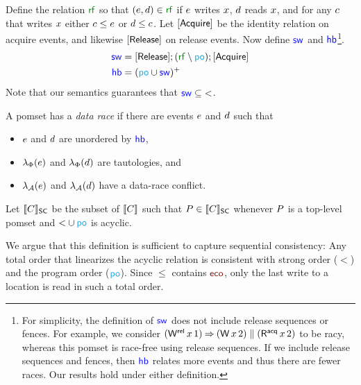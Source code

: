 Define the relation ${\rrfx}$ so that $(\aEv,\bEv)\in{\rrfx}$ if $e$
writes $x$, $d$ reads $x$, and for any $c$ that writes $x$
either $c\leq e$ or $d\leq c$.  Let $[\mathsf{Acquire}]$ be the identity
relation on acquire events, and likewise $[\mathsf{Release}]$ on release events.  Now
define $\mathrel{\color{blue}\mathsf{sw}}$ and $\mathrel{\color{blue}\mathsf{hb}}$\footnote{For simplicity, the definition of $\mathrel{\color{blue}\mathsf{sw}}$
  does not include release sequences or fences.  For example, we consider
  \begin{math}
    (\DWRel{x}{1})\prefix(\DW{x}{2}) \parallel (\DRAcq{x}{2})
  \end{math}
  to be racy, whereas this pomset is race-free using release sequences.  If
  we include release sequences and fences, then $\mathrel{\color{blue}\mathsf{hb}}$ relates more events
  and thus there are fewer races. Our results hold under either definition.}.
\begin{align*}
  {\rsw} &= \IDRel; ({\rrfx}\setminus{\rpox}); \IDAcq
  \\
  {\rhb} &= ({\rpox} \cup {\rsw})^+
\end{align*}
Note that our semantics guarantees that ${\mathrel{\color{blue}\mathsf{sw}}}\subseteq{<}$.

A pomset has a \emph{data race} if there are events $e$ and $d$ such
that
\begin{itemize}
\item $e$ and $d$ are unordered by $\mathrel{\color{blue}\mathsf{hb}}$,
\item $\lambda_{\Phi}(e)$ and $\lambda_{\Phi}(d)$ are tautologies, and
\item $\lambda_{\mathcal{A}}(e)$ and $\lambda_{\mathcal{A}}(d)$ have a data-race conflict.
\end{itemize}

\begin{definition}
  Let $\llbracket C\rrbracket_{\mathsf{SC}}$ be the subset of $\llbracket C\rrbracket$ such that
  $P\in\llbracket C\rrbracket_{\mathsf{SC}}$ whenever $P$ is a top-level pomset and ${\lt}\cup{\rpox}$ is acyclic.
\end{definition}
We argue that this definition is sufficient to capture sequential
consistency: Any total order that linearizes the acyclic relation is
consistent with strong order ($\lt$) and the program order ($\rpox$).  Since $\le$ contains $\reco$, only the last write to a location is
read in such a total order.

